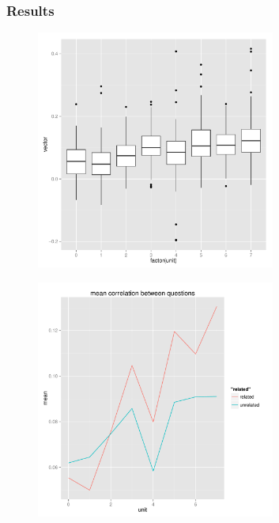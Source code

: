 \documentclass[12pt,a4paper]{article}
\begin{document}
\begin{singlespace}
\subsubsection{Results}
\vspace{-0.5cm}
\begin{figure}[h!]
    \centering
    \includegraphics[width=0.7\textwidth,trim= 0 0 20 30, clip]{quizcorrelationbox.pdf}
\end{figure}

\vspace{-0.5cm}
\begin{figure}[h!]
    \centering
    \includegraphics[width=0.7\textwidth,trim= 0 0 20 30, clip]{correlationlines.pdf}
\end{figure}
\FloatBarrier


\end{singlespace}
\end{document}
